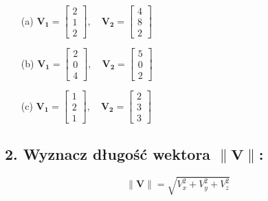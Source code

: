 \begin{enumerate}
    \item[(a)] $\mathbf{V_1} = \begin{bmatrix} 2 \\ 1 \\ 2 \end{bmatrix}, \quad
    \mathbf{V_2} = \begin{bmatrix} 4 \\ 8 \\ 2 \end{bmatrix}$
    
    \item[(b)] $\mathbf{V_1} = \begin{bmatrix} 2 \\ 0 \\ 4 \end{bmatrix}, \quad
    \mathbf{V_2} = \begin{bmatrix} 5 \\ 0 \\ 2 \end{bmatrix}$
    
    \item[(c)] $\mathbf{V_1} = \begin{bmatrix} 1 \\ 2 \\ 1 \end{bmatrix}, \quad
    \mathbf{V_2} = \begin{bmatrix} 2 \\ 3 \\ 3 \end{bmatrix}$
\end{enumerate}

\subsection*{2. Wyznacz długość wektora $\|\mathbf{V}\|$:}

\[
\|\mathbf{V}\| = \sqrt{V_x^2 + V_y^2 + V_z^2}
\]

